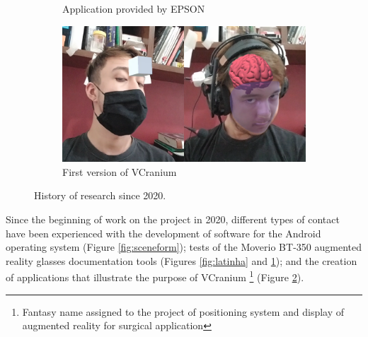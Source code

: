 \begin{figure}[H]
\begin{subfigure}{0.45\textwidth}
        \caption{Application provided by EPSON}
        \label{fig:papercar}
    \end{subfigure}
    \begin{subfigure}{0.45\textwidth}
        \centering
        \includegraphics[width=.95\linewidth]{figuras/VCranium.png}
        \caption{First version of VCranium}
        \label{fig:vcranium_alpha}
    \end{subfigure}
    \caption{History of research since 2020.}
    \label{fig:historico}
\end{figure}

Since the beginning of work on the project in 2020, different types of contact have been experienced with the development of software for the Android operating system (Figure \ref{fig:sceneform}); tests of the Moverio BT-350 augmented reality glasses documentation tools (Figures \ref{fig:latinha} and \ref{fig:papercar}); and the creation of applications that illustrate the purpose of VCranium \footnote[1]{Fantasy name assigned to the project of positioning system and display of augmented reality for surgical application} (Figure \ref{fig:vcranium_alpha}).